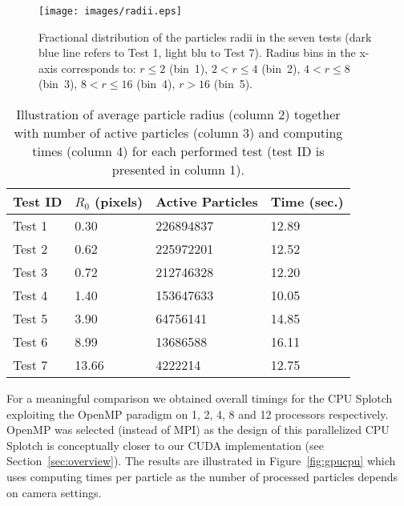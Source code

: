 \documentclass[1p]{elsarticle}
\begin{document}
\begin{figure}
\centering
\texttt{[image: images/radii.eps]}
\caption{Fractional distribution of the particles radii in the seven tests (dark blue line refers to Test 1, light blu to Test 7). Radius bins in the x-axis corresponds to: $r\le 2$ (bin~1), $2<r\le 4$ (bin~2), $4<r\le 8$ (bin~3), $8<r\le 16$ (bin~4), $r>16$ (bin~5). 
}
\label{fig:radii}
\end{figure}

\begin{table}
\begin{center}
\begin{tabular}{|l|l|l|l|}
\hline
Test ID & $R_0$ (pixels) & Active Particles & Time (sec.) \\
\hline
Test 1  & 0.30   & 226894837  & 12.89 \\
\hline
Test 2  & 0.62   & 225972201  & 12.52 \\
\hline
Test 3  & 0.72   & 212746328  & 12.20 \\
\hline
Test 4  & 1.40   & 153647633  & 10.05 \\
\hline
Test 5  & 3.90   & 64756141   & 14.85 \\
\hline
Test 6  & 8.99   & 13686588   & 16.11 \\
\hline
Test 7  & 13.66  & 4222214    & 12.75 \\
\hline
\end{tabular}
\end{center}
\caption{Illustration of average particle radius (column 2) together with number of active particles (column 3)
and computing times (column 4) for each performed test (test ID is presented in column 1).}
\label{tab:radius}
\end{table}


For a meaningful comparison we obtained overall timings for the CPU Splotch exploiting the OpenMP paradigm on 1, 2, 4, 8 and 12 processors respectively. OpenMP was selected (instead of MPI) as the design of this parallelized CPU Splotch is conceptually closer to our CUDA implementation (see Section~\ref{sec:overview}). The results are illustrated in Figure~\ref{fig:gpucpu} which uses computing times per particle as the number of processed particles depends on camera settings.
\end{document}
